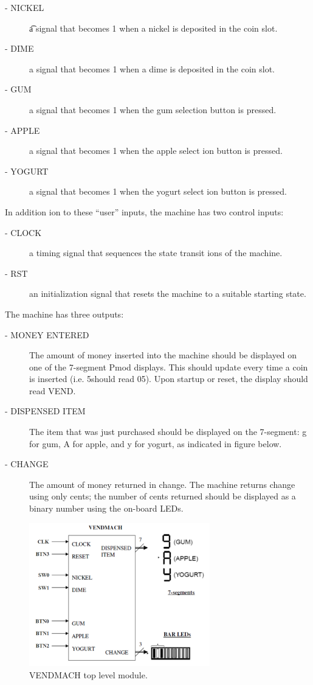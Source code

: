 \begin{description}
	\item[ - NICKEL]  \t a signal that becomes 1 when a nickel is deposited in the coin slot.
	\item[ - DIME] a signal that becomes 1 when a dime is deposited in the coin slot.
	\item[ - GUM] a signal that becomes 1 when the gum selection button is pressed.
	\item[ - APPLE] a signal that becomes 1 when the apple select ion button is pressed.
	\item[ - YOGURT] a signal that becomes 1 when the yogurt select ion button is pressed.
\end{description}
In addition ion to these “user” inputs, the machine has two control inputs:
\begin{description}
	\item[ - CLOCK] a timing signal that sequences the state transit ions of the machine.
	\item[ - RST] an initialization signal that resets the machine to a suitable starting
	state.
\end{description}
The machine has three outputs:
\begin{description}
	\item[ - MONEY ENTERED] The amount of money inserted into the machine should be displayed on one of the 7-segment Pmod displays. This should update every time a coin is inserted (i.e. 5\cent should read 05). Upon startup or reset, the display should read VEND.
	\item[ - DISPENSED ITEM] The item that was just purchased should be displayed on the 7-segment: g for gum, A for apple, and y for yogurt, as indicated in figure below.
	\item[ - CHANGE] The amount of money returned in change. The machine returns change using only	cents; the number of cents returned should be displayed as a binary number using the on-board LEDs.
\end{description}


\begin{figure}[H]
	\centering
	\includegraphics[width=0.7\textwidth]{01_images/Vivado_lab3_DesignSpec3_ModuleOverview.PNG}
	\caption{VENDMACH top level module.}
	\label{fig: Vivado_lab3_DesignSpec3_ModuleOverview}
\end{figure}

